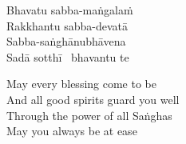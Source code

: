 \begin{pali-hang-continued}
Bhavatu sabba-maṅgalaṁ\\
Rakkhantu sabba-devatā\\
Sabba-saṅghānubhāvena\\
Sadā sotthī \breathmark\ bhavantu te
\end{pali-hang-continued}

\begin{english-verses}
  May every blessing come to be\\
  And all good spirits guard you well\\
  Through the power of all Saṅghas\\
  May you always be at ease
\end{english-verses}

\suttaRef{[Trad]}

